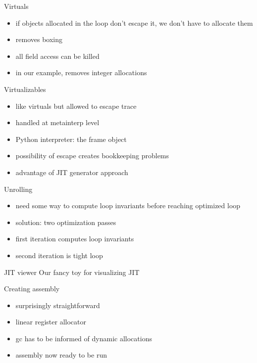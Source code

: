 \documentclass[14pt]{beamer}
\begin{document}
\begin{frame}{Virtuals}
\begin{itemize}
\item if objects allocated in the loop don't escape it, we don't have to
  allocate them
\item removes boxing
\item all field access can be killed
\item in our example, removes integer allocations
\end{itemize}
\end{frame}

\begin{frame}{Virtualizables}
\begin{itemize}
\item like virtuals but allowed to escape trace
\item handled at metainterp level
\item Python interpreter: the frame object
\item possibility of escape creates bookkeeping problems
\item advantage of JIT generator approach
\end{itemize}
\end{frame}

\begin{frame}{Unrolling}
\begin{itemize}
\item need some way to compute loop invariants before reaching optimized loop
\item solution: two optimization passes
\item first iteration computes loop invariants
\item second iteration is tight loop
\end{itemize}
\end{frame}

\begin{frame}{JIT viewer}
Our fancy toy for visualizing JIT
\end{frame}

\begin{frame}{Creating assembly}
\begin{itemize}
\item surprisingly straightforward
\item linear register allocator
\item gc has to be informed of dynamic allocations
\item assembly now ready to be run
\end{itemize}
\end{frame}
\end{document}
